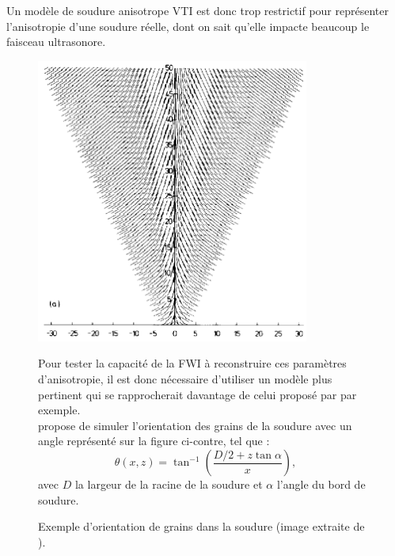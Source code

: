  
Un modèle de soudure anisotrope VTI est donc trop restrictif pour représenter l'anisotropie d'une soudure réelle, dont on sait qu'elle impacte beaucoup le faisceau ultrasonore. 


\begin{figure}[!h]
\begin{minipage}{0.34\textwidth}
		\includegraphics[width=0.8\textwidth]{img/ogilvy_modele.png}
		\caption{ Exemple d'orientation de grains dans la soudure (image extraite de \cite{ogilvy}).}
\end{minipage}
\hfill
\begin{minipage}{0.65\textwidth}
Pour tester la capacité de la FWI à reconstruire ces paramètres d'anisotropie, il est donc nécessaire d'utiliser un modèle plus pertinent qui se rapprocherait davantage de celui proposé par \cite{ogilvy} par exemple.\\
\cite{ogilvy} propose de simuler l'orientation des grains de la soudure avec un angle représenté sur la figure ci-contre, tel que : 
\begin{equation}
	\theta(x,z) = \tan^{-1}\left( \frac{D/2 + z\tan\alpha}{x} \right),
\end{equation}
avec $D$ la largeur de la racine de la soudure et $\alpha$  l'angle du bord de soudure. 
\end{minipage}

\end{figure}



